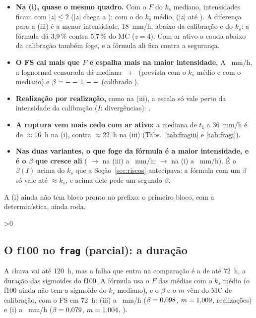 \documentclass[11pt,a4paper]{article}
\begin{document}
\begin{itemize}
  \item \textbf{Na (i), quase o mesmo quadro.} Com o $F$ do $k_s$ mediano,
    \fragZkDentroi{} intensidades ficam com $|z| \le 2$ ($|z|$ chega a \fragZki); com o do $k_s$ médio,
    \fragZmDentroi{} ($|z|$ até \fragZmMaxi). A diferença para a (iii) é a menor intensidade, 18~mm/h, abaixo da
    calibração e do $k_s$: a fórmula dá 3,9\,\% contra 5,7\,\% do MC ($z = 4$). Com ar ativo a cauda abaixo da
    calibração também foge, e a fórmula ali fica contra a segurança.
  \item \textbf{O FS cai mais que $F$ e espalha mais na maior intensidade.} A \fragTopIi~mm/h, a lognormal censurada dá
    mediana \fragCensMedi~$\pm$~\fragCensMedSei{} (prevista \fragPrevMedMedioi{} com o $k_s$ médio e \fragPrevMedi{}
    com o mediano) e $\beta = -- \pm --$ (calibrado \fragBetai).
  \item \textbf{Realização por realização,} como na (iii), a escala só vale perto da intensidade da calibração
    ($I$: divergências): \fragPari.
  \item \textbf{A ruptura vem mais cedo com ar ativo:} a mediana de $t_1$ a 36~mm/h é de $\approx 16$~h na (i),
    contra $\approx 22$~h na (iii) (Tabs.~\ref{tab:fragiii} e \ref{tab:fragi}).
  \item \textbf{Nas duas variantes, o que foge da fórmula é a maior intensidade, e é o $\beta$ que cresce ali}
    (\fragBetaiii{} $\to$ \fragCensBetaiii{} na (iii) a \fragTopIiii~mm/h; \fragBetai{} $\to$ \fragCensBetai{} na (i)
    a \fragTopIi~mm/h). É o $\beta(I)$ acima do $k_s$ que a Seção~\ref{sec:riscos} antecipava: a fórmula com um
    $\beta$ só vale até $\approx k_s$, e acima dele pede um segundo $\beta$.
\end{itemize}
\else
A (i) ainda não tem bloco pronto no prefixo: o primeiro bloco, com a determinística, ainda roda.
\fi

\ifnum\fragCemTem>0
\subsection{O f100 no \texttt{frag} (parcial): a duração}\label{sec:mcf100}
A chuva vai até 120~h, mas a falha que entra na comparação é a de até 72~h, a duração das sigmoides do f100. A fórmula
usa o $F$ das médias com o $k_s$ médio (o f100 ainda não tem a sigmoide do $k_s$ mediano), e o $\beta$ e o $m$ vêm do
MC de calibração, com o FS em 72~h: (iii) a \fragCemIcaliii~mm/h ($\beta = 0{,}098$, $m = 1{,}009$,
\fragCemNcaliii{} realizações) e (i) a \fragCemIcali~mm/h ($\beta = 0{,}079$, $m = 1{,}004$, \fragCemNcali).
\end{document}
